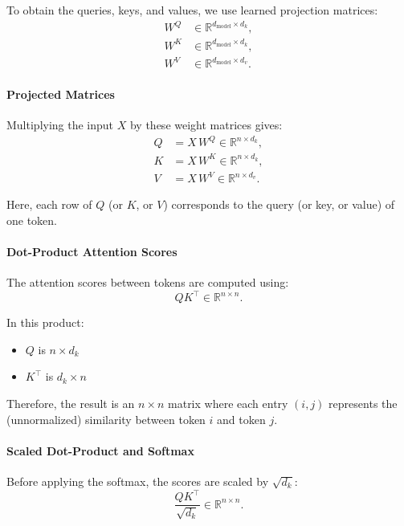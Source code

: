    To obtain the queries, keys, and values, we use learned projection matrices:
   \[
   \begin{aligned}
   W^Q &\in \mathbb{R}^{d_{\text{model}} \times d_k}, \\
   W^K &\in \mathbb{R}^{d_{\text{model}} \times d_k}, \\
   W^V &\in \mathbb{R}^{d_{\text{model}} \times d_v}.
   \end{aligned}
   \]

\paragraph{Projected Matrices}
   Multiplying the input \( X \) by these weight matrices gives:
   \[
   \begin{aligned}
   Q &= X\,W^Q \in \mathbb{R}^{n \times d_k}, \\
   K &= X\,W^K \in \mathbb{R}^{n \times d_k}, \\
   V &= X\,W^V \in \mathbb{R}^{n \times d_v}.
   \end{aligned}
   \]
   
   Here, each row of \( Q \) (or \( K \), or \( V \)) corresponds to the query (or key, or value) of one token.

\paragraph{Dot-Product Attention Scores}

   The attention scores between tokens are computed using:
   \[
   QK^\top \in \mathbb{R}^{n \times n}.
   \]
   
   In this product:
   \begin{itemize}
	   \item \( Q \) is \( n \times d_k \)
	   \item \( K^\top \) is \( d_k \times n \)
   \end{itemize}
   
   
   Therefore, the result is an \( n \times n \) matrix where each entry \((i,j)\) represents the (unnormalized) similarity between token \( i \) and token \( j \).

   \paragraph{Scaled Dot-Product and Softmax}

   Before applying the softmax, the scores are scaled by \( \sqrt{d_k} \):
   \[
   \frac{QK^\top}{\sqrt{d_k}} \in \mathbb{R}^{n \times n}.
   \]
   
